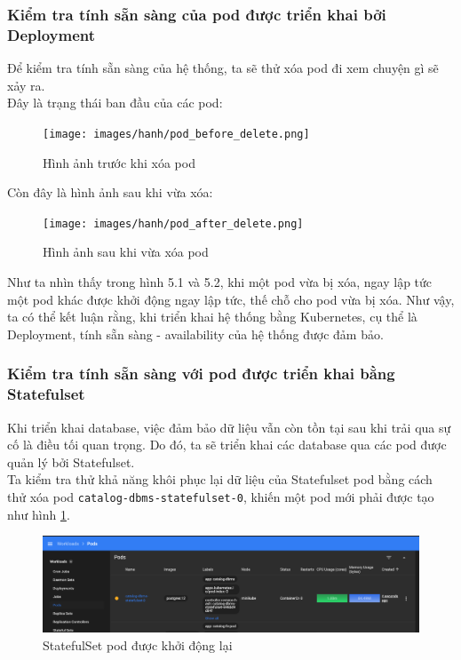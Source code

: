 \subsubsection{Kiểm tra tính sẵn sàng của pod được triển khai bởi Deployment}
\noindent Để kiểm tra tính sẵn sàng của hệ thống, ta sẽ thử xóa pod đi xem chuyện gì sẽ xảy ra.\\[0.5cm]
Đây là trạng thái ban đầu của các pod:
\begin{figure}[H]
  \begin{center}
  \texttt{[image: images/hanh/pod\_before\_delete.png]}
  \caption{Hình ảnh trước khi xóa pod}
  \end{center}
\end{figure}
Còn đây là hình ảnh sau khi vừa xóa:
\begin{figure}[H]
  \begin{center}
  \texttt{[image: images/hanh/pod\_after\_delete.png]}
  \caption{Hình ảnh sau khi vừa xóa pod}
  \end{center}
\end{figure}
Như ta nhìn thấy trong hình 5.1 và 5.2, khi một pod vừa bị xóa, ngay lập tức một pod khác được khởi động ngay lập tức, thế chỗ cho pod vừa bị xóa. Như vậy, ta có thể kết luận rằng, khi triển khai hệ thống bằng Kubernetes, cụ thể là Deployment, tính sẵn sàng - availability của hệ thống được đảm bảo.
\subsubsection{Kiểm tra tính sẵn sàng với pod được triển khai bằng Statefulset}
\noindent Khi triển khai database, việc đảm bảo dữ liệu vẫn còn tồn tại sau khi trải qua sự cố là điều tối quan trọng. Do đó, ta sẽ triển khai các database qua các pod được quản lý bởi Statefulset.\\[0.5cm]
Ta kiểm tra thử khả năng khôi phục lại dữ liệu của Statefulset pod bằng cách thử xóa pod \lstinline|catalog-dbms-statefulset-0|, khiến một pod mới phải được tạo như hình \ref{fig:catalog-sts-test}.
\begin{figure}[H]
  \begin{center}
    \includegraphics[scale=0.4]{images/hanh/catalog-sts-restart}
  \end{center}
  \caption{StatefulSet pod được khởi động lại}
  \label{fig:catalog-sts-test}

\end{figure}

